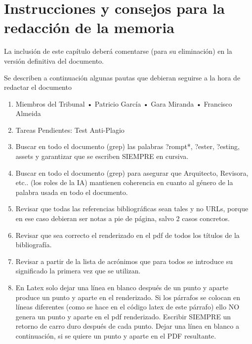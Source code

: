 

\chapter*{Instrucciones y consejos para la redacción de la memoria}
La inclusión de este capítulo deberá comentarse (para su eliminación) en la versión definitiva del documento.

Se describen a continuación algunas pautas que debieran seguirse a la hora de redactar el documento

\begin{enumerate}
\item Miembros del Tribunal
• Patricio García
• Gara Miranda
• Francisco Almeida
\item Tareas Pendientes: Test Anti-Plagio

\item Buscar en todo el documento (grep) las palabras ?rompt*, ?ester, ?esting, assets y garantizar que se escriben SIEMPRE en cursiva.

\item Buscar en todo el documento (grep) para asegurar que Arquitecto, Revisora, etc.. (los roles de la IA) mantienen coherencia en cuanto al género de la palabra usada en todo el documento.

\item Revisar que todas las referencias bibliográficas sean tales y no URLs, porque en ese caso debieran ser notas a pie de página, salvo 2 casos concretos.

\item Revisar que sea correcto el renderizado en el pdf de todos los títulos de la bibliografía.

\item Revisar a partir de la lista de acrónimos que para todos se introduce su significado la primera vez que se utilizan.

\item En Latex solo dejar una línea en blanco después de un punto y aparte produce un punto y aparte en el renderizado.
Si los párrafos se colocan en líneas diferentes (como se hace en el código latex de este párrafo) ello NO genera un punto y aparte en el pdf renderizado.
Escribir SIEMPRE un retorno de carro duro después de cada punto.
Dejar una línea en blanco a continuación, si se quiere un punto y aparte en el PDF resultante.


\end{enumerate}

